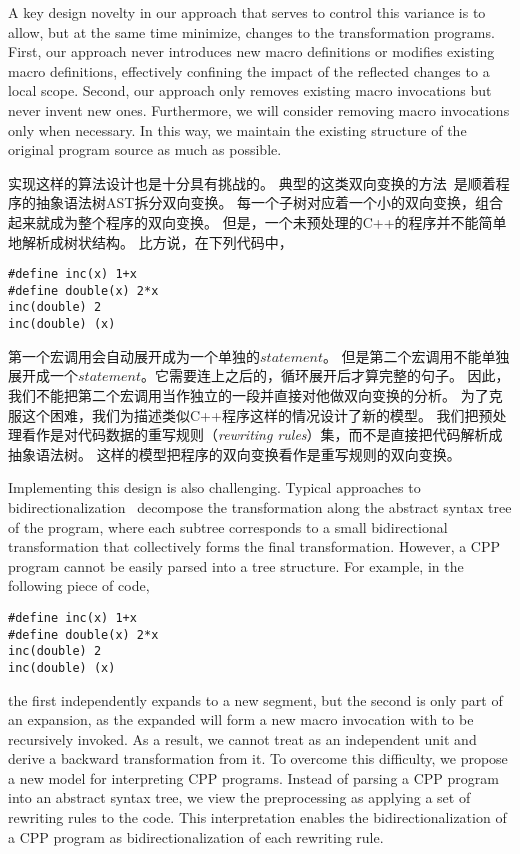 A key design novelty in our approach that serves to control this variance is to allow, but at the same time minimize, changes to the transformation programs. First, our approach 
never introduces new macro definitions or modifies existing macro definitions, effectively confining the impact of the reflected changes to a local scope.
Second, our approach only removes existing macro invocations but never
invent new ones. %
Furthermore, we will consider removing macro
invocations only when necessary. In this way, we maintain the
existing structure of the original program source as much as possible.

实现这样的算法设计也是十分具有挑战的。
典型的这类双向变换的方法~\parencite{MaHNHT07,Voigtlander09bff,MMHT10}是顺着程序的抽象语法树AST拆分双向变换。
每一个子树对应着一个小的双向变换，组合起来就成为整个程序的双向变换。
但是，一个未预处理的C++的程序并不能简单地解析成树状结构。
比方说，在下列代码中，
\begin{lstlisting}
#define inc(x) 1+x
#define double(x) 2*x
inc(double) 2
inc(double) (x)
\end{lstlisting}
第一个宏调用会自动展开成为一个单独的$statement$。
但是第二个宏调用不能单独展开成一个$statement$。它需要连上之后的，循环展开后才算完整的句子。
因此，我们不能把第二个宏调用当作独立的一段并直接对他做双向变换的分析。
为了克服这个困难，我们为描述类似C++程序这样的情况设计了新的模型。
我们把预处理看作是对代码数据的重写规则（\emph{rewriting rules}）集，而不是直接把代码解析成抽象语法树。
这样的模型把程序的双向变换看作是重写规则的双向变换。

Implementing this design is also challenging. Typical approaches to
bidirectionalization~\parencite{MaHNHT07,Voigtlander09bff,MMHT10} decompose
the transformation along the abstract syntax tree of the program, where
each subtree corresponds to a small bidirectional transformation that
collectively forms the final transformation. However, a CPP program
cannot be easily parsed into a tree structure. For example, in the
following piece of code, 
\begin{lstlisting}
#define inc(x) 1+x
#define double(x) 2*x
inc(double) 2
inc(double) (x)
\end{lstlisting}
the first  independently
expands to a new segment, but the second  is only
part of an expansion, as the expanded  will form a new
macro invocation with  to be recursively invoked. As a
result, we cannot treat  as an independent unit and
derive a backward transformation from it.
To overcome this difficulty, we propose a new model for interpreting
CPP programs. Instead of parsing a CPP program into an abstract syntax
tree, we view the preprocessing as applying a set of rewriting rules
to the code. This interpretation enables the bidirectionalization
of a CPP program   as bidirectionalization of each rewriting rule.

